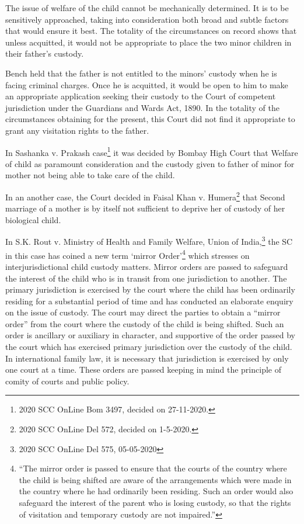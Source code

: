 \begin{multicols}{2}
\noi
The issue of welfare of the child cannot be mechanically determined. It is to be sensitively
approached, taking into consideration both broad and subtle factors that would ensure it best. The
totality of the circumstances on record shows that unless acquitted, it would not be appropriate to
place the two minor children in their father’s custody.

\noi
Bench held that the father is not entitled to the minors’ custody when he is facing criminal charges.
Once he is acquitted, it would be open to him to make an appropriate application seeking their
custody to the Court of competent jurisdiction under the Guardians and Wards Act, 1890. In the totality of the circumstances obtaining for the present, this Court did not find it appropriate to
grant any visitation rights to the father.

\noi
In Sashanka v. Prakash case\footnote{2020 SCC OnLine Bom 3497, decided on 27-11-2020.} it was decided by Bombay High Court that Welfare of child as
paramount consideration and the custody given to father of minor for mother not being able to
take care of the child.

\noi
In an another case, the Court decided in Faisal Khan v. Humera\footnote{2020 SCC OnLine Del 572, decided on 1-5-2020.} that Second marriage of a mother is by itself not sufficient to deprive her of custody of her biological child.

\noi
In S.K. Rout v. Ministry of Health and Family Welfare, Union of India,\footnote{2020 SCC OnLine Del 575, 05-05-2020} the SC in this case has coined a new term ‘mirror Order’\footnote{“The mirror order is passed to ensure that the courts of the country where the child is being shifted are aware of the arrangements which were made in the country where he had ordinarily been residing. Such an order would also safeguard the interest of the parent who is losing custody, so that the rights of visitation and temporary custody are not impaired.”} which stresses on interjurisdictional child custody matters.
\noi
Mirror orders are passed to safeguard the interest of the child who is in transit from one
jurisdiction to another. The primary jurisdiction is exercised by the court where the child has been
ordinarily residing for a substantial period of time and has conducted an elaborate enquiry on the
issue of custody. The court may direct the parties to obtain a “mirror order” from the court where
the custody of the child is being shifted. Such an order is ancillary or auxiliary in character, and
supportive of the order passed by the court which has exercised primary jurisdiction over the
custody of the child. In international family law, it is necessary that jurisdiction is exercised by
only one court at a time. These orders are passed keeping in mind the principle of comity of courts
and public policy.


\end{multicols}
